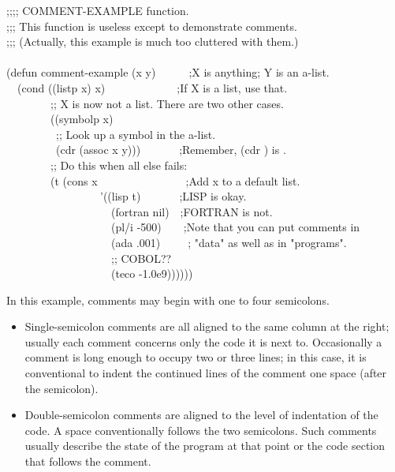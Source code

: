 \begin{flushdesc}
\begin{lisp}
;;;; COMMENT-EXAMPLE function. \\
;;; This function is useless except to demonstrate comments. \\
;;; (Actually, this example is much too cluttered with them.) \\
 \\
(defun comment-example (x y)~~~~~~;X is anything; Y is an a-list. \\
~~(cond ((listp x) x)~~~~~~~~~~~~~;If X is a list, use that. \\
~~~~~~~~;; X is now not a list.  There are two other cases. \\
~~~~~~~~((symbolp x) \\
~~~~~~~~~;; Look up a symbol in the a-list. \\
~~~~~~~~~(cdr (assoc x y)))~~~~~~~;Remember, (cdr {\false}) is {\false}. \\
~~~~~~~~;; Do this when all else fails: \\
~~~~~~~~(t (cons x~~~~~~~~~~~~~~~~;Add x to a default list. \\
~~~~~~~~~~~~~~~~~'((lisp t)~~~~~~~;LISP is okay. \\
~~~~~~~~~~~~~~~~~~~(fortran nil)~~;FORTRAN is not. \\
~~~~~~~~~~~~~~~~~~~(pl/i -500)~~~~;Note that you can put comments in \\
~~~~~~~~~~~~~~~~~~~(ada .001)~~~~~; "data" as well as in "programs". \\
~~~~~~~~~~~~~~~~~~~;; COBOL?? \\
~~~~~~~~~~~~~~~~~~~(teco -1.0e9))))))
\end{lisp}
In this example, comments may begin with one to four semicolons.
\begin{itemize}
\item
Single-semicolon comments are all aligned to the same column at
the right; usually each comment concerns only the code it is next to.
Occasionally a comment is long enough to occupy two or three
lines; in this case, it is conventional to indent the
continued lines of the comment one space (after the
semicolon).

\item
{}
Double-semicolon comments are aligned to the level of indentation
of the code.  A space conventionally follows the two semicolons.
Such comments usually describe the state of the program at that point
or the code section that follows the comment.


\end{itemize}
\end{flushdesc}
